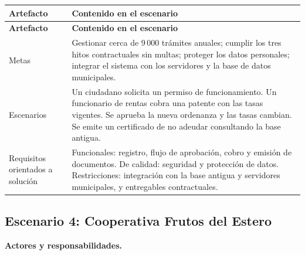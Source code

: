 \documentclass[12pt,a4paper]{article}
\begin{document}
{\small
\setlength{\tabcolsep}{4pt}
\renewcommand{\arraystretch}{1.3}
\begin{longtable}{
|>{\raggedright\arraybackslash}p{}
|>{\raggedright\arraybackslash}p{}|}
\hline
\textbf{Artefacto} & \textbf{Contenido en el escenario} \\
\hline
\endfirsthead
\hline
\textbf{Artefacto} & \textbf{Contenido en el escenario} \\
\hline
\endhead
Metas & Gestionar cerca de 9\,000 trámites anuales; cumplir los tres hitos contractuales sin multas; proteger los datos personales; integrar el sistema con los servidores y la base de datos municipales. \\
\hline
Escenarios & Un ciudadano solicita un permiso de funcionamiento. Un funcionario de rentas cobra una patente con las tasas vigentes. Se aprueba la nueva ordenanza y las tasas cambian. Se emite un certificado de no adeudar consultando la base antigua. \\
\hline
Requisitos orientados a solución & Funcionales: registro, flujo de aprobación, cobro y emisión de documentos. De calidad: seguridad y protección de datos. Restricciones: integración con la base antigua y servidores municipales, y entregables contractuales. \\
\hline
\end{longtable}
}

\subsection{Escenario 4: Cooperativa Frutos del Estero}

\textbf{Actores y responsabilidades.}
\end{document}
